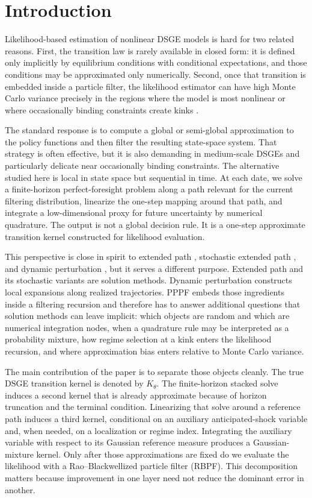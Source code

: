 \documentclass[11pt]{article}
\theoremstyle{remark}
\begin{document}
\section{Introduction}

Likelihood-based estimation of nonlinear DSGE models is hard for two related reasons.
First, the transition law is rarely available in closed form: it is defined only implicitly by equilibrium conditions with conditional expectations, and those conditions may be approximated only numerically.
Second, once that transition is embedded inside a particle filter, the likelihood estimator can have high Monte Carlo variance precisely in the regions where the model is most nonlinear or where occasionally binding constraints create kinks \citep{KantasDoucetSinghMaciejowski2015,AndrieuDoucetHolenstein2010}.

The standard response is to compute a global or semi-global approximation to the policy functions and then filter the resulting state-space system.
That strategy is often effective, but it is also demanding in medium-scale DSGEs and particularly delicate near occasionally binding constraints.
The alternative studied here is local in state space but sequential in time.
At each date, we solve a finite-horizon perfect-foresight problem along a path relevant for the current filtering distribution, linearize the one-step mapping around that path, and integrate a low-dimensional proxy for future uncertainty by numerical quadrature.
The output is not a global decision rule.
It is a one-step approximate transition kernel constructed for likelihood evaluation.

This perspective is close in spirit to extended path \citep{FairTaylor1983}, stochastic extended path \citep{AdjemianJuillard2025}, and dynamic perturbation \citep{MennuniRubioRamirezStepanchuk2025}, but it serves a different purpose.
Extended path and its stochastic variants are solution methods.
Dynamic perturbation constructs local expansions along realized trajectories.
PPPF embeds those ingredients inside a filtering recursion and therefore has to answer additional questions that solution methods can leave implicit: which objects are random and which are numerical integration nodes, when a quadrature rule may be interpreted as a probability mixture, how regime selection at a kink enters the likelihood recursion, and where approximation bias enters relative to Monte Carlo variance.

The main contribution of the paper is to separate those objects cleanly.
The true DSGE transition kernel is denoted by $K_\theta$.
The finite-horizon stacked solve induces a second kernel that is already approximate because of horizon truncation and the terminal condition.
Linearizing that solve around a reference path induces a third kernel, conditional on an auxiliary anticipated-shock variable and, when needed, on a localization or regime index.
Integrating the auxiliary variable with respect to its Gaussian reference measure produces a Gaussian-mixture kernel.
Only after those approximations are fixed do we evaluate the likelihood with a Rao--Blackwellized particle filter (RBPF).
This decomposition matters because improvement in one layer need not reduce the dominant error in another.
\end{document}
